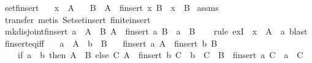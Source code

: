 \begin{isabellebody}
\endisatagproof
{\isafoldproof}%
%
\isadelimproof
%
\endisadelimproof
%
\isadelimdocument
%
\endisadelimdocument
%
\isatagdocument
%
\isamarkuptrue%
%
\endisatagdocument
{\isafolddocument}%
%
\isadelimdocument
%
\endisadelimdocument
{}\isamarkupfalse%
\ set{\isacharunderscore}finsert{\isacharcolon}\isanewline
\ \ \ {\isachardoublequoteopen}x\ {\isacharbar}{\isasymin}{\isacharbar}\ A{\isachardoublequoteclose}\isanewline
\ \ \ B\ \ {\isachardoublequoteopen}A\ {\isacharequal}\ finsert\ x\ B{\isachardoublequoteclose}\ \ {\isachardoublequoteopen}x\ {\isacharbar}{\isasymnotin}{\isacharbar}\ B{\isachardoublequoteclose}\isanewline
%
\isadelimproof
%
\endisadelimproof
%
\isatagproof
{}\isamarkupfalse%
\ assms\ \isamarkupfalse%
\ transfer\ {\isacharparenleft}metis\ Set{\isachardot}set{\isacharunderscore}insert\ finite{\isacharunderscore}insert{\isacharparenright}%
\endisatagproof
{\isafoldproof}%
%
\isadelimproof
\isanewline
%
\endisadelimproof
\isanewline
{}\isamarkupfalse%
\ mk{\isacharunderscore}disjoint{\isacharunderscore}finsert{\isacharcolon}\ {\isachardoublequoteopen}a\ {\isacharbar}{\isasymin}{\isacharbar}\ A\ {\isasymLongrightarrow}\ {\isasymexists}B{\isachardot}\ A\ {\isacharequal}\ finsert\ a\ B\ {\isasymand}\ a\ {\isacharbar}{\isasymnotin}{\isacharbar}\ B{\isachardoublequoteclose}\isanewline
%
\isadelimproof
\ \ %
\endisadelimproof
%
\isatagproof
{}\isamarkupfalse%
\ {\isacharparenleft}rule\ exI\ {\isacharbrackleft}\ x\ {\isacharequal}\ {\isachardoublequoteopen}A\ {\isacharbar}{\isacharminus}{\isacharbar}\ {\isacharbraceleft}{\isacharbar}a{\isacharbar}{\isacharbraceright}{\isachardoublequoteclose}{\isacharbrackright}{\isacharparenright}\ blast%
\endisatagproof
{\isafoldproof}%
%
\isadelimproof
\isanewline
%
\endisadelimproof
\isanewline
{}\isamarkupfalse%
\ finsert{\isacharunderscore}eq{\isacharunderscore}iff{\isacharcolon}\isanewline
\ \ \ {\isachardoublequoteopen}a\ {\isacharbar}{\isasymnotin}{\isacharbar}\ A{\isachardoublequoteclose}\ \ {\isachardoublequoteopen}b\ {\isacharbar}{\isasymnotin}{\isacharbar}\ B{\isachardoublequoteclose}\isanewline
\ \ \ {\isachardoublequoteopen}{\isacharparenleft}finsert\ a\ A\ {\isacharequal}\ finsert\ b\ B{\isacharparenright}\ {\isacharequal}\isanewline
\ \ \ \ {\isacharparenleft}if\ a\ {\isacharequal}\ b\ then\ A\ {\isacharequal}\ B\ else\ {\isasymexists}C{\isachardot}\ A\ {\isacharequal}\ finsert\ b\ C\ {\isasymand}\ b\ {\isacharbar}{\isasymnotin}{\isacharbar}\ C\ {\isasymand}\ B\ {\isacharequal}\ finsert\ a\ C\ {\isasymand}\ a\ {\isacharbar}{\isasymnotin}{\isacharbar}\ C{\isacharparenright}{\isachardoublequoteclose}\isanewline

\end{isabellebody}
